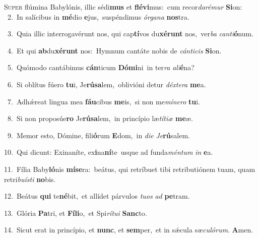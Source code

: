 \lettrine{\initial\textcolor{\initialcolor}{S}}{uper} flúmina Babylónis, illic sédi\textbf{mus} et \textbf{flé}\-\textbf{vi}mus:~\star cum recor\-\textit{da}\-\textit{ré}\textit{mur} \textbf{Si}\-on:\\
{\numbfont\textcolor{\numbcolor}{~2.}}~In salícibus in \textbf{mé}\-dio \textbf{e}\-jus,~\star suspéndimus \textit{ór}\-\textit{ga}\textit{na} \textbf{nos}\-tra.\par
{\numbfont\textcolor{\numbcolor}{~3.}}~Quia illic interrogavérunt nos, qui cap\-\textbf{tí}\-vos du\-\textbf{xé}\-\textbf{runt} nos,~\star ver\textit{ba} \textit{can}\-\textit{ti}\textbf{ó}num.\par
{\numbfont\textcolor{\numbcolor}{~4.}}~Et qui \textbf{ab}\-du\-\textbf{xé}\-\textbf{runt} nos:~\star Hymnum cantáte nobis de \textit{cán}\-\textit{ti}\textit{cis} \textbf{Si}\-on.\par
{\numbfont\textcolor{\numbcolor}{~5.}}~Quómodo cantábimus \textbf{cán}\-ticum \textbf{Dó}\-\textbf{mi}ni~\star in ter\textit{ra} \textit{a}\-\textit{li}\textbf{é}na?\par
{\numbfont\textcolor{\numbcolor}{~6.}}~Si oblítus fúero \textbf{tu}\-i, Je\-\textbf{rú}\-\textbf{sa}lem,~\star oblivióni detur \textit{déx}\-\textit{te}\textit{ra} \textbf{me}\-a.\par
{\numbfont\textcolor{\numbcolor}{~7.}}~Adhǽreat lingua mea \textbf{fáu}\-cibus \textbf{me}\-is,~\star si non me\-\textit{mí}\-\textit{ne}\textit{ro} \textbf{tu}\-i.\par
{\numbfont\textcolor{\numbcolor}{~8.}}~Si non proposúe\textbf{ro} Je\-\textbf{rú}\-\textbf{sa}lem,~\star in princípio læ\-\textit{tí}\-\textit{ti}\textit{æ} \textbf{me}\-æ.\par
{\numbfont\textcolor{\numbcolor}{~9.}}~Memor esto, Dómine, fili\-\textbf{ó}\-rum \textbf{E}\-dom,~\star in \textit{di}\-\textit{e} \textit{Je}\-\textbf{rú}salem.\par
{\numbfont\textcolor{\numbcolor}{10.}}~Qui dicunt: Exinaníte, ex\-\textbf{i}\-na\-\textbf{ní}\-te~\star usque ad funda\-\textit{mén}\-\textit{tum} \textit{in} \textbf{e}\-a.\par
{\numbfont\textcolor{\numbcolor}{11.}}~Fília Baby\-\textbf{ló}\-nis \textbf{mí}\-\textbf{se}ra:~\star beátus, qui retríbuet tibi retributiónem tuam, quam retri\-\textit{bu}\-\textit{ís}\textit{ti} \textbf{no}\-bis.\par
{\numbfont\textcolor{\numbcolor}{12.}}~Beátus \textbf{qui} te\-\textbf{né}\-bit,~\star et allídet párvulos \textit{tu}\-\textit{os} \textit{ad} \textbf{pe}\-tram.\par
{\numbfont\textcolor{\numbcolor}{13.}}~Glória \textbf{Pa}\-tri, et \textbf{Fí}\-\textbf{li}o,~\star et Spi\-\textit{rí}\-\textit{tu}\textit{i} \textbf{Sanc}\-to.\par
{\numbfont\textcolor{\numbcolor}{14.}}~Sicut erat in princípio, et \textbf{nunc}\-, et \textbf{sem}\-per,~\star et in sǽcula sæ\-\textit{cu}\-\textit{ló}\textit{rum}. \textbf{A}\-men.\par
